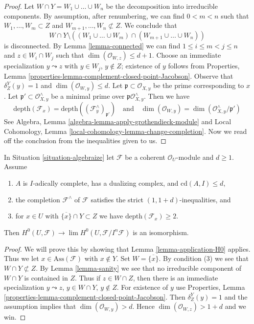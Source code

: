\begin{proof}
Let $W \cap Y = W_1 \cup \ldots \cup W_n$ be the decomposition into
irreducible components. By assumption, after renumbering, we can find
$0 < m < n$ such that $W_1, \ldots, W_m  \subset Z$ and
$W_{m + 1}, \ldots, W_n \not \subset Z$. We conclude that
$$
W \cap Y \setminus
\left((W_1 \cup \ldots \cup W_m) \cap (W_{m + 1} \cup \ldots \cup W_n)\right)
$$
is disconnected. By Lemma \ref{lemma-connected} we can find
$1 \leq i \leq m < j \leq n$ and
$z \in W_i \cap W_j$ such that $\dim(\mathcal{O}_{W, z}) \leq d + 1$.
Choose an immediate specialization $y \leadsto z$ with
$y \in W_j$, $y \not \in Z$; existence of $y$ follows from
Properties, Lemma \ref{properties-lemma-complement-closed-point-Jacobson}.
Observe that $\delta^Y_Z(y) = 1$ and $\dim(\mathcal{O}_{W, y}) \leq d$.
Let $\mathfrak p \subset \mathcal{O}_{X, y}$ be the prime corresponding to $x$.
Let $\mathfrak p' \subset \mathcal{O}_{X, y}^\wedge$ be a minimal prime
over $\mathfrak p\mathcal{O}_{X, y}^\wedge$. Then we have
$$
\text{depth}(\mathcal{F}_x) =
\text{depth}((\mathcal{F}^\wedge_y)_{\mathfrak p'})
\quad\text{and}\quad
\dim(\mathcal{O}_{W, y}) = \dim(\mathcal{O}_{X, y}^\wedge/\mathfrak p')
$$
See Algebra, Lemma \ref{algebra-lemma-apply-grothendieck-module} and
Local Cohomology, Lemma \ref{local-cohomology-lemma-change-completion}.
Now we read off the conclusion from the inequalities given to us.
\end{proof}

\begin{lemma}
\label{lemma-recover}
In Situation \ref{situation-algebraize} let $\mathcal{F}$ be a
coherent $\mathcal{O}_U$-module and $d \geq 1$. Assume
\begin{enumerate}
\item $A$ is $I$-adically complete, has a dualizing complex, and
$\text{cd}(A, I) \leq d$,
\item the completion $\mathcal{F}^\wedge$ of $\mathcal{F}$
satisfies the strict $(1, 1+ d)$-inequalities, and
\item for $x \in U$ with $\overline{\{x\}} \cap Y \subset Z$
we have $\text{depth}(\mathcal{F}_x) \geq 2$.
\end{enumerate}
Then $H^0(U, \mathcal{F}) \to \lim H^0(U, \mathcal{F}/I^n\mathcal{F})$
is an isomorphism.
\end{lemma}

\begin{proof}
We will prove this by showing that Lemma \ref{lemma-application-H0} applies.
Thus we let $x \in \text{Ass}(\mathcal{F})$ with $x \not \in Y$.
Set $W = \overline{\{x\}}$.
By condition (3) we see that $W \cap Y \not \subset Z$.
By Lemma \ref{lemma-sanity} we see that no irreducible
component of $W \cap Y$ is contained in $Z$.
Thus if $z \in W \cap Z$, then there is an immediate
specialization $y \leadsto z$, $y \in W \cap Y$, $y \not \in Z$.
For existence of $y$ use
Properties, Lemma \ref{properties-lemma-complement-closed-point-Jacobson}.
Then $\delta^Y_Z(y) = 1$ and the assumption
implies that $\dim(\mathcal{O}_{W, y}) > d$.
Hence $\dim(\mathcal{O}_{W, z}) > 1 + d$ and we win.
\end{proof}

